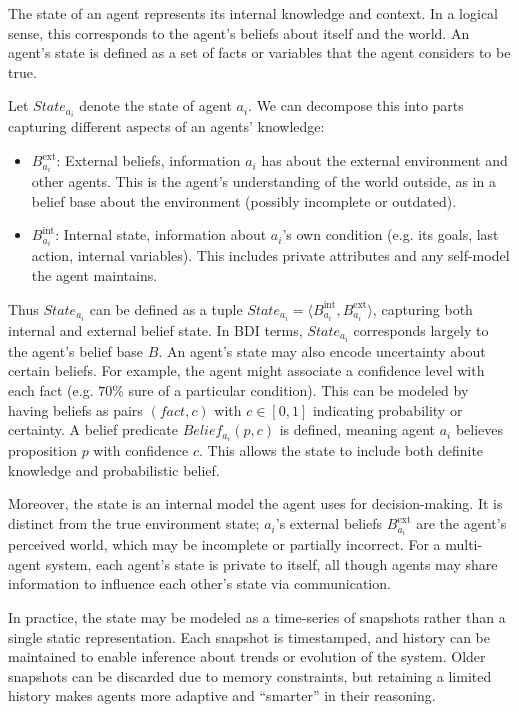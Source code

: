 The state of an agent represents its internal knowledge and context. In a logical sense, this corresponds to the agent’s beliefs about itself and the world. An agent’s state is defined as a set  of facts or variables that the agent considers to be true. 

Let $State_{a_i}$ denote the state of agent $a_i$. We can decompose this into parts capturing different aspects of an agents' knowledge:
\begin{itemize}
    \item $B^{\text{ext}}_{a_i}$: External beliefs, information $a_i$ has about the external environment and other agents. This is the agent’s understanding of the world outside, as in a belief base about the environment (possibly incomplete or outdated).

    \item $B^{\text{int}}_{a_i}$: Internal state, information about $a_i$’s own condition (e.g. its goals, last action, internal variables). This includes private attributes and any self-model the agent maintains.
\end{itemize}

Thus $State_{a_i}$ can be defined as a tuple $State_{a_i} = \langle B^{\text{int}}_{a_i}, B^{\text{ext}}_{a_i} \rangle$, capturing both internal and external belief state. 
In BDI terms, $State_{a_i}$ corresponds largely to the agent’s belief base $B$. An agent’s state may also encode uncertainty about certain beliefs. For example, the agent might associate a confidence level with each fact (e.g. $70\%$ sure of a particular condition). This can be modeled by having beliefs as pairs $(fact, c)$ with $c \in [0,1]$ indicating probability or certainty. A belief predicate $Belief_{a_i}(p, c)$ is defined, meaning agent $a_i$ believes proposition $p$ with confidence $c$. This allows the state to include both definite knowledge and probabilistic belief.

Moreover, the state is an internal model the agent uses for decision-making. It is distinct from the true environment state; $a_i$’s external beliefs $B^{\text{ext}}_{a_i}$ are the agent’s perceived world, which may be incomplete or partially incorrect. For a multi-agent system, each agent’s state is private to itself, all though agents may share information to influence each other’s state via communication.

In practice, the state may be modeled as a time-series of snapshots rather than a single static representation. Each snapshot is timestamped, and history can be maintained to enable inference about trends or evolution of the system. Older snapshots can be discarded due to memory constraints, but retaining a limited history makes agents more adaptive and “smarter” in their reasoning. 



